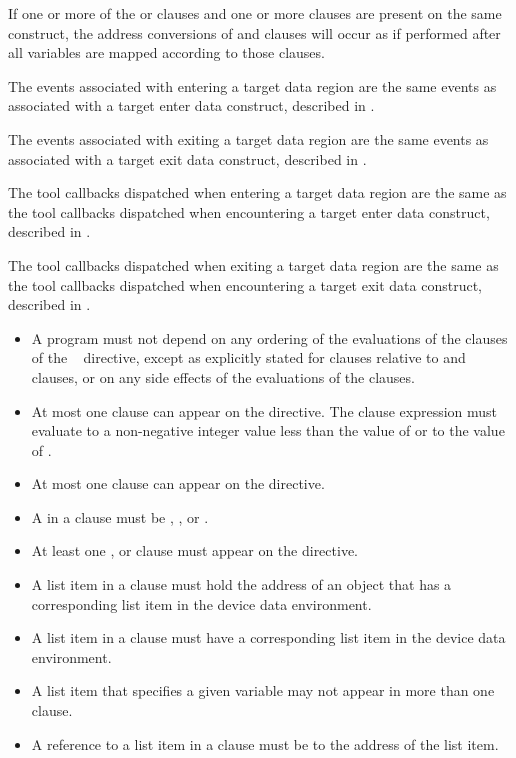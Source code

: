 If one or more of the  or
 clauses and one or more  clauses are present on the
same construct, the address conversions of  and
 clauses will occur as if performed after all variables
are mapped according to those  clauses.

\events

The events associated with entering a target data region are the same events
as associated with a target enter data construct, described in 
. 
 
The events associated with exiting a target data region are the same events
as associated with a target exit data construct, described in
. 

\tools

The tool callbacks dispatched when entering a target data region are
the same as the tool callbacks dispatched when encountering
a target enter data construct, described in
.
 
The tool callbacks dispatched when exiting a target data region are
the same as the tool callbacks dispatched when encountering
a target exit data construct, described in
.

\restrictions
\begin{itemize}
\item A program must not depend on any ordering of the evaluations of the
      clauses of the ~ directive, except as explicitly
      stated for  clauses relative to  and
       clauses, or on any side effects of the evaluations 
      of the clauses.
\item At most one  clause can appear on the directive. The
       clause expression  must evaluate to a non-negative integer
      value less than the value of  or to the value of
      .
\item At most one  clause can appear on the directive.
\item A  in a  clause must be , , 
       or .
\item At least one ,  or 
      clause must appear on the directive.
\item A list item in a  clause must hold the address of
      an object that has a corresponding list item in the device data environment.
\item A list item in a  clause must have a
      corresponding list item in the device data environment.
\item A list item that specifies a given variable may not appear in more than
      one  clause.
\item A reference to a list item in a  clause must be to
      the address of the list item.
\end{itemize}


